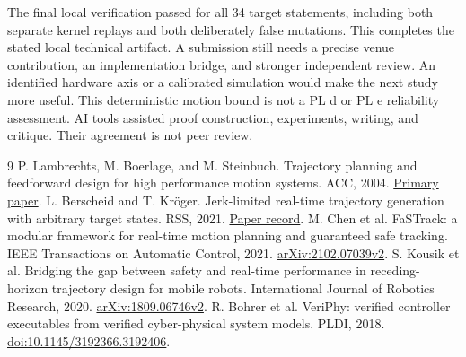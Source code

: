 \documentclass[11pt]{article}
\begin{document}
The final local verification passed for all 34 target statements, including both separate kernel replays and both deliberately false mutations. This completes the stated local technical artifact.
A submission still needs a precise venue contribution, an implementation bridge, and stronger independent review.
An identified hardware axis or a calibrated simulation would make the next study more useful. This deterministic motion bound is not a PL d or PL e reliability assessment.
AI tools assisted proof construction, experiments, writing, and critique. Their agreement is not peer review.

\begin{thebibliography}{9}\small
{} P. Lambrechts, M. Boerlage, and M. Steinbuch.
Trajectory planning and feedforward design for high performance motion systems.
ACC, 2004.
\href{https://skoge.folk.ntnu.no/prost/proceedings/acc04/Papers/0827_FrM03.2.pdf}{Primary paper}.
 L. Berscheid and T. Kr\"oger.
Jerk-limited real-time trajectory generation with arbitrary target states.
RSS, 2021.
\href{https://roboticsproceedings.org/rss17/p015.html}{Paper record}.
 M. Chen et al.
FaSTrack: a modular framework for real-time motion planning and guaranteed safe tracking.
IEEE Transactions on Automatic Control, 2021.
\href{https://arxiv.org/abs/2102.07039v2}{arXiv:2102.07039v2}.
 S. Kousik et al.
Bridging the gap between safety and real-time performance in receding-horizon trajectory design for mobile robots.
International Journal of Robotics Research, 2020.
\href{https://arxiv.org/abs/1809.06746v2}{arXiv:1809.06746v2}.
 R. Bohrer et al.
VeriPhy: verified controller executables from verified cyber-physical system models.
PLDI, 2018.
\href{https://doi.org/10.1145/3192366.3192406}{doi:10.1145/3192366.3192406}.
\end{thebibliography}
\end{document}
